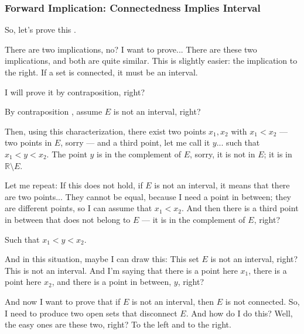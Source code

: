 \begin{proofWrapper}

\subsubsection{Forward Implication: Connectedness Implies Interval}

\begin{speech}[00:05:32 - 00:07:53]
So, let's prove this .

There are two implications, no? I want to prove...  There are these two implications, and both are quite similar. This is slightly easier: the implication to the right. If a set is connected, it must be an interval.

I will prove it by contraposition, right?

By contraposition , assume $E$ is not an interval, right? 

Then, using this characterization, there exist two points $x_1, x_2$ with $x_1 < x_2$ --- two points in $E$, sorry --- and a third point, let me call it $y$... such that $x_1 < y < x_2$. The point $y$ is in the complement of $E$, sorry, it is not in $E$; it is in $\mathbb{R} \setminus E$. 

Let me repeat: If this does not hold, if $E$ is not an interval, it means that there are two points... They cannot be equal, because I need a point in between; they are different points, so I can assume that $x_1 < x_2$. And then there is a third point in between that does not belong to $E$ --- it is in the complement of $E$, right?

Such that $x_1 < y < x_2$.
\end{speech}

\begin{speech}[00:07:53 - 00:09:30]
And in this situation, maybe I can draw this: This set $E$ is not an interval, right? This is not an interval. And I'm saying that there is a point here $x_1$, there is a point here $x_2$, and there is a point in between, $y$, right? 

And now I want to prove that if $E$ is not an interval, then $E$ is not connected. So, I need to produce two open sets that disconnect $E$. And how do I do this? Well, the easy ones are these two, right?  To the left and to the right.


\end{speech}
\end{proofWrapper}
